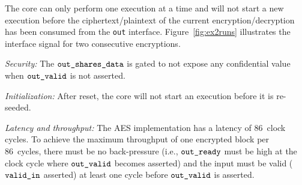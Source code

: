 \documentclass{scrartcl}
\begin{document}
The core can only perform one execution at a time and will not start a new
execution before the ciphertext/plaintext of the current encryption/decryption has been consumed from
the \texttt{out} interface.
Figure~\ref{fig:ex2runs} illustrates the interface signal for two consecutive encryptions.

\emph{Security:}
The $\texttt{out\_shares\_data}$ is gated to not expose any confidential value when
$\texttt{out\_valid}$ is not asserted.

\emph{Initialization:}
After reset, the core will not start an execution before it is re-seeded.

\emph{Latency and throughput:}
The AES implementation has a latency of 86~clock cycles. To achieve the
maximum throughput of one encrypted block per 86~cycles, there must be no
back-pressure (i.e., $\texttt{out\_ready}$ must be high at the clock cycle where
$\texttt{out\_valid}$ becomes asserted) and the input must be valid
($\texttt{valid\_in}$ asserted) at least one cycle before $\texttt{out\_valid}$ is
asserted.
\end{document}
